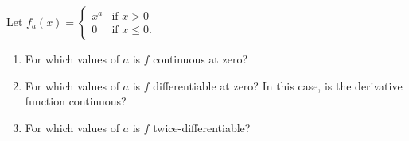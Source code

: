 \documentclass{lew98_solutions}
\begin{document}
\begin{exercise}
\label{ex:5.2.5}
    Let \( f_a(x) = \begin{cases}
        x^a & \text{if } x > 0 \\
        0 & \text{if } x \leq 0.
    \end{cases} \)
    \begin{enumerate}
        \item For which values of \( a \) is \( f \) continuous at zero?

        \item For which values of \( a \) is \( f \) differentiable at zero? In this case, is the derivative function continuous?

        \item For which values of \( a \) is \( f \) twice-differentiable?
    \end{enumerate}
\end{exercise}
\end{document}
